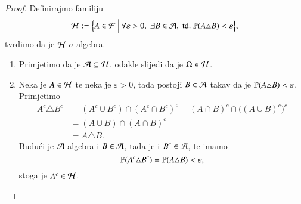 \begin{rj}[\ref{zad:9.10}]
    \begin{proof}
        Definirajmo familiju
        \begin{equation*}
            \mathcal{H} := \Big\{{A \in \mathcal{F}} \: \Big| \: {\forall \varepsilon > 0, \; \exists B \in \mathcal{A}, \; \mathrm{td.} \; \mathbb{P} (A \triangle B) < \varepsilon}\Big\},
        \end{equation*}
        tvrdimo da je $\mathcal{H}$ $\sigma$-algebra.
        \begin{enumerate}[label=(\roman*)]
            \item
            Primjetimo da je $\mathcal{A} \subseteq \mathcal{H}$, odakle slijedi da je $\Omega \in \mathcal{H}$.
            \item
            Neka je $A \in \mathcal{H}$ te neka je $\varepsilon > 0$, tada postoji $B \in \mathcal{A}$ takav da je $\mathbb{P} (A \triangle B) < \varepsilon$.
            Primjetimo
            \begin{equation*}
                \begin{aligned}
                    A^c \triangle B^c &= (A^c \cup B^c) \cap (A^c \cap B^c)^c = (A \cap B)^c \cap \big( (A \cup B)^c \big)^c\\
                    &= (A \cup B) \cap (A \cap B)^c\\
                    &= A \triangle B.
                \end{aligned}
            \end{equation*}
            Budu\' ci je $\mathcal{A}$ algebra i $B \in \mathcal{A}$, tada je i $B^c \in \mathcal{A}$, te imamo
            \begin{equation*}
                \mathbb{P} (A^c \triangle B^c) = \mathbb{P} (A \triangle B) < \varepsilon,
            \end{equation*}
            stoga je $A^c \in \mathcal{H}$.


\end{enumerate}
\end{proof}
\end{rj}

